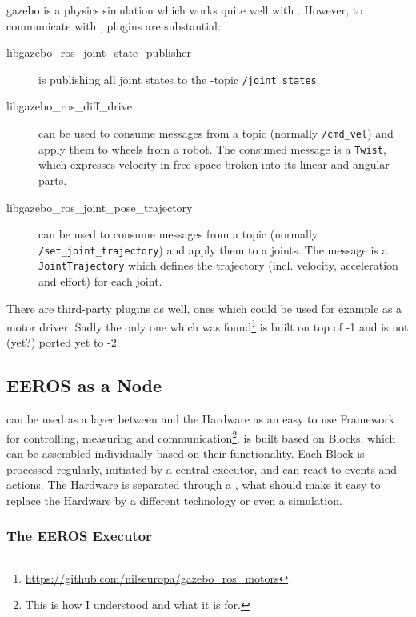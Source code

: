 \Gls{gazebo} is a physics simulation which works quite well with .
However, to communicate with , plugins are substantial:

\begin{description}
    \item[libgazebo\_ros\_joint\_state\_publisher] is publishing all joint states to the -\Gls{topic} \texttt{/joint\_states}.
    \item[libgazebo\_ros\_diff\_drive] can be used to consume messages from a topic (normally \texttt{/cmd\_vel}) and apply them to wheels from a robot. The consumed message is a \texttt{Twist}, which expresses velocity in free space broken into its linear and angular parts.
    \item[libgazebo\_ros\_joint\_pose\_trajectory] can be used to consume messages from a topic (normally \texttt{/set\_joint\_trajectory}) and apply them to a joints. The message is a \texttt{JointTrajectory} which defines the trajectory (incl. velocity, acceleration and effort) for each joint.
\end{description}

There are third-party plugins as well, ones which could be used for example as a motor driver.
Sadly the only one which was found\footnote{\url{https://github.com/nilseuropa/gazebo_ros_motors}} is built on top of -1 and is not (yet?) ported yet to -2.


\subsection[EEROS]{EEROS as a Node} \label{sec:eeros-node}

 can be used as a layer between  and the Hardware as an easy to use Framework for controlling, measuring and communication\footnote{This is how I understood  and what it is for.}.
 is built based on Blocks, which can be assembled individually based on their functionality.
Each Block is processed regularly, initiated by a central executor, and can react to events and actions.
The Hardware is separated through a , what should make it easy to replace the Hardware by a different technology or even a simulation.


\subsubsection[EEROS Executor]{The EEROS Executor} \label{sec:eeros-executor}

